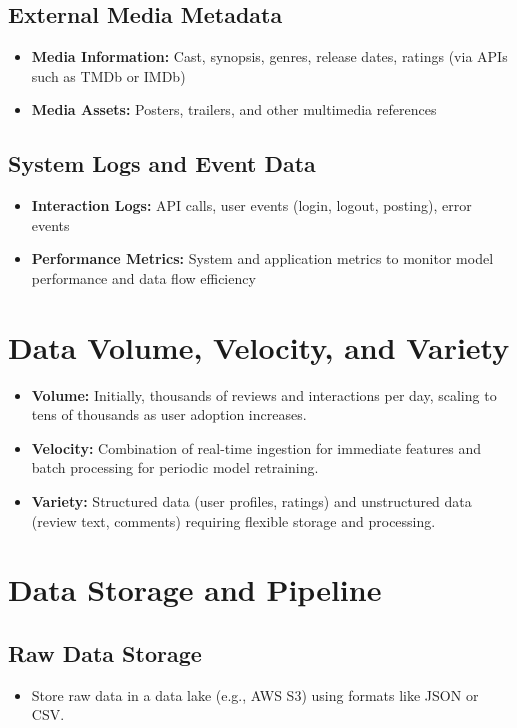 \documentclass[11pt]{article}
\begin{document}
\subsection*{External Media Metadata}
\begin{itemize}[noitemsep]
    \item \textbf{Media Information:} Cast, synopsis, genres, release dates, ratings (via APIs such as TMDb or IMDb)
    \item \textbf{Media Assets:} Posters, trailers, and other multimedia references
\end{itemize}

\subsection*{System Logs and Event Data}
\begin{itemize}[noitemsep]
    \item \textbf{Interaction Logs:} API calls, user events (login, logout, posting), error events
    \item \textbf{Performance Metrics:} System and application metrics to monitor model performance and data flow efficiency
\end{itemize}

\section{Data Volume, Velocity, and Variety}
\begin{itemize}[noitemsep]
    \item \textbf{Volume:} Initially, thousands of reviews and interactions per day, scaling to tens of thousands as user adoption increases.
    \item \textbf{Velocity:} Combination of real-time ingestion for immediate features and batch processing for periodic model retraining.
    \item \textbf{Variety:} Structured data (user profiles, ratings) and unstructured data (review text, comments) requiring flexible storage and processing.
\end{itemize}

\section{Data Storage and Pipeline}
\subsection*{Raw Data Storage}
\begin{itemize}[noitemsep]
    \item Store raw data in a data lake (e.g., AWS S3) using formats like JSON or CSV.
\end{itemize}
\end{document}
